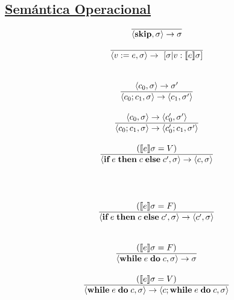  \subsection*{\underline{Semántica Operacional}}
    \begin{multicols}{2}
      \[\begin{array}{cll}
        \noindent
        \overline{\lang{\skipp, \sigma} \rightarrow \sigma} \\ \\
        
        \overline{\lang{v := e, \sigma} \rightarrow [\sigma | v : \semsAGU{e}]} \\ \\ \\
        
        \lang{c_0, \sigma} \rightarrow \sigma' \\
        \overline{\lang{c_0;c_1, \sigma} \rightarrow \lang{c_1, \sigma'}} \\ \\
        \lang{c_0, \sigma} \rightarrow \lang{c'_0, \sigma'} \\
        \overline{\lang{c_0;c_1, \sigma} \rightarrow \lang{c'_0; c_1, \sigma'}} \\ \\
        
        (\semsAGU{e} = V) \\
        \overline{\lang{\ifthenelse{e}{c}{c'}, \sigma} \rightarrow \lang{c, \sigma}} \\ \\ \\
      \end{array}\]
      \[\begin{array}{cll}
        \noindent
        \\
        (\semsAGU{e} = F) \\
        \overline{\lang{\ifthenelse{e}{c}{c'}, \sigma} \rightarrow \lang{c', \sigma}} \\ \\ \\

        (\semsAGU{e} = F) \\
        \overline{\lang{\while{e}{c}, \sigma} \rightarrow \sigma} \\ \\
        (\semsAGU{e} = V) \\
        \overline{\lang{\while{e}{c}, \sigma} \rightarrow \lang{c; \while{e}{c}, \sigma}} \\ \\ \\


\end{array}\]
\end{multicols}
